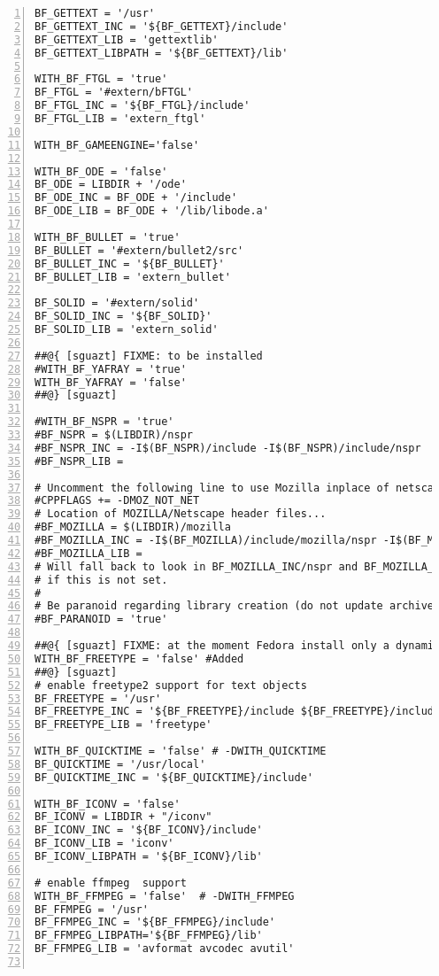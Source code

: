 \begin{lstlisting}[basicstyle={\small\ttfamily},breaklines=true,frame=single,numbers=left]
BF_GETTEXT = '/usr'
BF_GETTEXT_INC = '${BF_GETTEXT}/include'
BF_GETTEXT_LIB = 'gettextlib'
BF_GETTEXT_LIBPATH = '${BF_GETTEXT}/lib'

WITH_BF_FTGL = 'true'
BF_FTGL = '#extern/bFTGL'
BF_FTGL_INC = '${BF_FTGL}/include'
BF_FTGL_LIB = 'extern_ftgl'

WITH_BF_GAMEENGINE='false'

WITH_BF_ODE = 'false'
BF_ODE = LIBDIR + '/ode'
BF_ODE_INC = BF_ODE + '/include'
BF_ODE_LIB = BF_ODE + '/lib/libode.a'

WITH_BF_BULLET = 'true'
BF_BULLET = '#extern/bullet2/src'
BF_BULLET_INC = '${BF_BULLET}'
BF_BULLET_LIB = 'extern_bullet'

BF_SOLID = '#extern/solid'
BF_SOLID_INC = '${BF_SOLID}'
BF_SOLID_LIB = 'extern_solid'

##@{ [sguazt] FIXME: to be installed
#WITH_BF_YAFRAY = 'true'
WITH_BF_YAFRAY = 'false'
##@} [sguazt]

#WITH_BF_NSPR = 'true'
#BF_NSPR = $(LIBDIR)/nspr
#BF_NSPR_INC = -I$(BF_NSPR)/include -I$(BF_NSPR)/include/nspr
#BF_NSPR_LIB = 

# Uncomment the following line to use Mozilla inplace of netscape
#CPPFLAGS += -DMOZ_NOT_NET
# Location of MOZILLA/Netscape header files...
#BF_MOZILLA = $(LIBDIR)/mozilla
#BF_MOZILLA_INC = -I$(BF_MOZILLA)/include/mozilla/nspr -I$(BF_MOZILLA)/include/mozilla -I$(BF_MOZILLA)/include/mozilla/xpcom -I$(BF_MOZILLA)/include/mozilla/idl
#BF_MOZILLA_LIB =
# Will fall back to look in BF_MOZILLA_INC/nspr and BF_MOZILLA_LIB
# if this is not set.
#
# Be paranoid regarding library creation (do not update archives)
#BF_PARANOID = 'true'

##@{ [sguazt] FIXME: at the moment Fedora install only a dynamic version of freetype
WITH_BF_FREETYPE = 'false' #Added
##@} [sguazt]
# enable freetype2 support for text objects
BF_FREETYPE = '/usr'
BF_FREETYPE_INC = '${BF_FREETYPE}/include ${BF_FREETYPE}/include/freetype2'
BF_FREETYPE_LIB = 'freetype'

WITH_BF_QUICKTIME = 'false' # -DWITH_QUICKTIME
BF_QUICKTIME = '/usr/local'
BF_QUICKTIME_INC = '${BF_QUICKTIME}/include'

WITH_BF_ICONV = 'false'
BF_ICONV = LIBDIR + "/iconv"
BF_ICONV_INC = '${BF_ICONV}/include'
BF_ICONV_LIB = 'iconv'
BF_ICONV_LIBPATH = '${BF_ICONV}/lib'

# enable ffmpeg  support
WITH_BF_FFMPEG = 'false'  # -DWITH_FFMPEG
BF_FFMPEG = '/usr'
BF_FFMPEG_INC = '${BF_FFMPEG}/include'
BF_FFMPEG_LIBPATH='${BF_FFMPEG}/lib'
BF_FFMPEG_LIB = 'avformat avcodec avutil'


\end{lstlisting}
